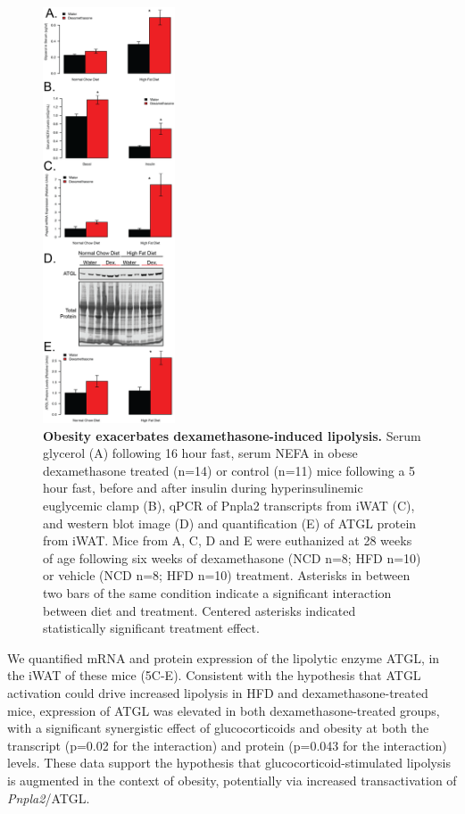 \documentclass[11pt]{article} %
\begin{document}
\begin{figure}
  \begin{center}
    \includegraphics[width=0.35\textwidth]{Figures_Figure_5.png}
  \end{center}
  \caption{\textbf{Obesity exacerbates dexamethasone-induced lipolysis.}  Serum glycerol (A) following 16 hour fast, serum NEFA in obese dexamethasone treated (n=14) or control (n=11) mice following a 5 hour fast, before and after insulin during hyperinsulinemic euglycemic clamp (B), qPCR of Pnpla2 transcripts from iWAT (C), and western blot image (D) and quantification (E) of ATGL protein from iWAT. Mice from A, C, D and E were euthanized at 28 weeks of age following six weeks of dexamethasone (NCD n=8; HFD n=10) or vehicle (NCD n=8; HFD n=10) treatment. Asterisks in between two bars of the same condition indicate a significant interaction between diet and treatment. Centered asterisks indicated statistically significant treatment effect.}
 \label{fig:5}
\end{figure}

We quantified mRNA and protein expression of the lipolytic enzyme ATGL,
in the iWAT of these mice (5C-E). Consistent with the hypothesis that
ATGL activation could drive increased lipolysis in HFD and
dexamethasone-treated mice, expression of ATGL was elevated in both
dexamethasone-treated groups, with a significant synergistic effect of
glucocorticoids and obesity at both the transcript (p=0.02 for the
interaction) and protein (p=0.043 for the interaction) levels. These
data support the hypothesis that glucocorticoid-stimulated lipolysis is
augmented in the context of obesity, potentially via increased
transactivation of \emph{Pnpla2}/ATGL.
\end{document}
